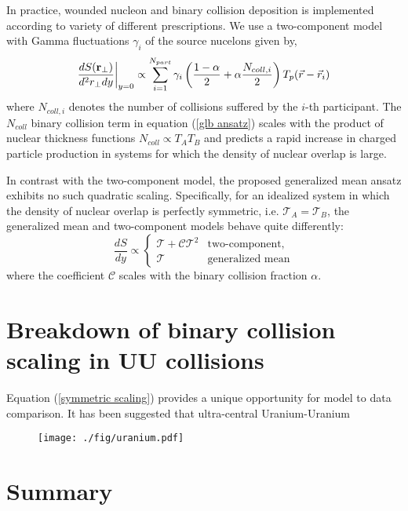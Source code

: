 \documentclass[aps,prl,reprint,amsmath,nofootinbib]{revtex4-1}
\begin{document}
In practice, wounded nucleon and binary collision deposition is implemented according to variety of different prescriptions. We use a two-component model
with Gamma fluctuations $\gamma_i$ of the source nucelons given by,
\begin{equation}
 \label{glb algorithm}
 \frac{dS({\bf r}_\perp)}{d^2r_\perp dy} \biggr \rvert_{y=0}  \propto \sum\limits_{i=1}^{N_{part}} \gamma_i \left(\frac{1-\alpha}{2} + \alpha \frac{N_{coll,i}}{2} \right ) T_p(\vec{r}-\vec{r}_i)
\end{equation}
where $N_{coll,i}$ denotes the number of collisions suffered by the $i$-th participant. The $N_{coll}$ binary collision term in equation (\ref{glb ansatz}) scales with the product of nuclear thickness 
functions $N_{coll} \propto T_A T_B$ and predicts a rapid increase in charged particle production in systems for which the density of nuclear overlap is large.  

In contrast with the two-component model, the proposed generalized mean ansatz exhibits no such quadratic scaling. Specifically, for an idealized system in which the density of nuclear overlap is perfectly symmetric, 
i.e. $\mathcal{T}_A = \mathcal{T}_B$, the generalized mean and two-component models behave quite differently:
\begin{equation}
   \label{symmetric scaling}
   \frac{dS}{dy} \propto
  \begin{cases}
   \mathcal{T} + \mathcal{C} \mathcal{T}^2 & \text{two-component,}\\
   \mathcal{T} & \text{generalized mean}
  \end{cases}
\end{equation}
where the coefficient $\mathcal{C}$ scales with the binary collision fraction $\alpha$.

\section{Breakdown of binary collision scaling in UU collisions}
Equation (\ref{symmetric scaling}) provides a unique opportunity for model to data comparison. It has been suggested that ultra-central Uranium-Uranium


\begin{figure}[H!]
 \centering
 \texttt{[image: ./fig/uranium.pdf]}
\end{figure}


\section{Summary}


\end{document}
